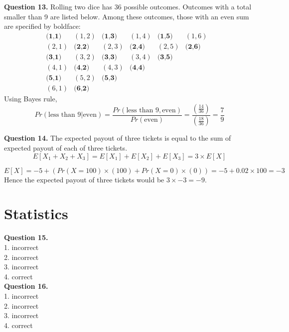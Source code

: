 \documentclass[10pt,a4paper]{article}
\newcommand{\question}[1]{\bigskip \noindent \textbf{Question #1.}}
\begin{document}
\question{13} Rolling two dice has 36 possible outcomes. Outcomes with a total smaller than 9 are listed below. Among these outcomes, those with an even sum are specified by boldface:
\begin{equation*}
\begin{matrix}
\textbf{(1,1)} & (1,2) & \textbf{(1,3)} & (1,4) & \textbf{(1,5)} & (1,6) \\
(2,1) & \textbf{(2,2)} & (2,3) & \textbf{(2,4)} & (2,5) & \textbf{(2,6)} \\
\textbf{(3,1)} & (3,2) & \textbf{(3,3)} & (3,4) & \textbf{(3,5)} && \\
(4,1) & \textbf{(4,2)} & (4,3) & \textbf{(4,4)} &&& \\
\textbf{(5,1)} & (5,2) & \textbf{(5,3)} &&&& \\
(6,1) & \textbf{(6,2)}
\end{matrix}
\end{equation*}
Using Bayes rule,
\begin{equation*}
Pr (\text{less than 9} | \text{even}) = \frac{Pr(\text{less than 9}, \text{even})}{Pr(\text{even})} = \frac{(\frac{14}{36})}{(\frac{18}{36})} = \frac{7}{9}
\end{equation*}

\question{14} The expected payout of three tickets is equal to the sum of expected payout of each of three tickets. 
\begin{equation*}
E[X_1 + X_2 + X_3] = E[X_1] + E[X_2] + E[X_3] = 3 \times E[X]
\end{equation*}

\begin{equation*}
E[X] = -5 + \left(Pr(X = 100) \times (100) + Pr(X = 0) \times (0)\right) = -5 + 0.02 \times 100 = -3
\end{equation*}
Hence the expected payout of three tickets would be $3 \times -3 = -9$.

\section{Statistics}

\question{15} \\
1. incorrect \\
2. incorrect \\
3. incorrect \\
4. correct \\

\question{16} \\
1. incorrect \\
2. incorrect \\
3. incorrect \\
4. correct \\
\end{document}

